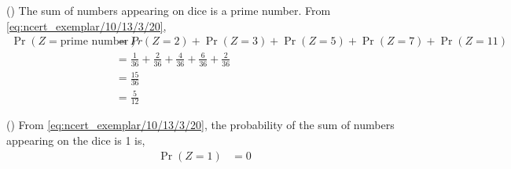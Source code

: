 \documentclass[]{article}
\begin{document}
() The sum of numbers appearing on dice is a prime number. From \eqref{eq:ncert_exemplar/10/13/3/20},
\begin{align}
\Pr(Z=\text{prime number}) &= Pr(Z=2) + \Pr(Z=3) + \Pr(Z=5) + \Pr(Z=7) + \Pr(Z=11) \\
&= \frac{1}{36} + \frac{2}{36} + \frac{4}{36} + \frac{6}{36} + \frac{2}{36} \\
&= \frac{15}{36} \\
&= \frac{5}{12}
\end{align}

() From \eqref{eq:ncert_exemplar/10/13/3/20}, the probability of the sum of numbers appearing on the dice is 1 is, 
\begin{align}
\Pr(Z=1) &= 0
\end{align}
\end{document}
